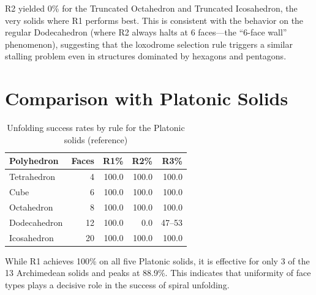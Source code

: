 \documentclass[a4paper,11pt]{article}
\begin{document}
R2 yielded 0\% for the Truncated Octahedron and Truncated Icosahedron,
the very solids where R1 performs best.
This is consistent with the behavior on the regular Dodecahedron
(where R2 always halts at 6 faces---the ``6-face wall'' phenomenon),
suggesting that the loxodrome selection rule triggers a similar stalling problem
even in structures dominated by hexagons and pentagons.

\section{Comparison with Platonic Solids}

\begin{table}[h]
\centering
\caption{Unfolding success rates by rule for the Platonic solids (reference)}
\label{tab:platonic}
\renewcommand{\arraystretch}{1.25}
\begin{tabular}{lrrrr}
\toprule
Polyhedron & Faces & R1\% & R2\% & R3\% \\
\midrule
Tetrahedron   &  4 & 100.0 & 100.0 & 100.0 \\
Cube          &  6 & 100.0 & 100.0 & 100.0 \\
Octahedron    &  8 & 100.0 & 100.0 & 100.0 \\
Dodecahedron  & 12 & 100.0 &   0.0 &  47--53 \\
Icosahedron   & 20 & 100.0 & 100.0 & 100.0 \\
\bottomrule
\end{tabular}
\end{table}

While R1 achieves 100\% on all five Platonic solids,
it is effective for only 3 of the 13 Archimedean solids and peaks at 88.9\%.
This indicates that uniformity of face types plays a decisive role
in the success of spiral unfolding.
\end{document}
